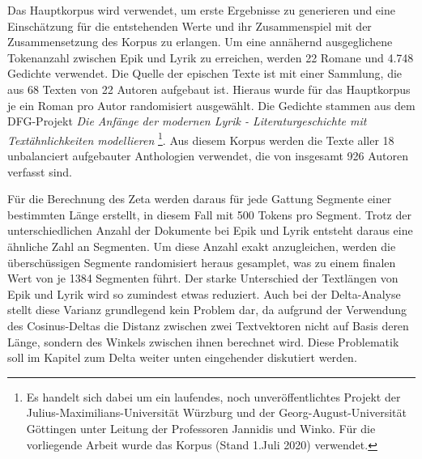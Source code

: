 \documentclass[a4paper,10p]{article}
\begin{document}
Das Hauptkorpus wird verwendet, um erste Ergebnisse zu generieren und eine Einschätz\-ung für die entstehenden Werte und ihr Zusammenspiel mit der Zusammensetzung des Korpus zu erlangen. Um eine annähernd ausgeglichene Tokenanzahl zwischen Epik und Lyrik zu erreichen, werden 22 Romane und 4.748 Gedichte verwendet. Die Quelle der epischen Texte ist \citep{ComputationalStylisticsGroup} mit einer Sammlung, die aus 68 Texten von 22 Autoren aufgebaut ist. Hieraus wurde für das Hauptkorpus je ein Roman pro Autor randomisiert ausgewählt. Die Gedichte stammen aus dem DFG-Projekt \textit{Die Anfänge der modernen Lyrik - Literaturgeschichte mit Textähnlichkeiten modellieren} \footnote{Es handelt sich dabei um ein laufendes, noch unveröffentlichtes Projekt der Julius-Maximilians-Universität Würzburg und der Georg-August-Universität Göttingen unter Leitung der Professoren Jannidis und Winko. Für die vorliegende Arbeit wurde das Korpus (Stand 1.Juli 2020) verwendet.}. Aus diesem Korpus werden die Texte aller 18 unbalanciert aufgebauter Anthologien verwendet, die von insgesamt 926 Autoren verfasst sind. \par 

Für die Berechnung des Zeta werden daraus für jede Gattung Segmente einer bestimmten Länge erstellt, in diesem Fall mit 500 Tokens pro Segment. Trotz der unterschiedlichen Anzahl der Dokumente bei Epik und Lyrik entsteht daraus eine ähnliche Zahl an Segmenten. Um diese Anzahl exakt anzugleichen, werden die überschüssigen Segmente randomisiert heraus gesamplet, was zu einem finalen Wert von je 1384 Segmenten führt. Der starke Unterschied der Textlängen von Epik und Lyrik wird so zumindest etwas reduziert. Auch bei der Delta-Analyse stellt diese Varianz  grundlegend kein Problem dar, da aufgrund der Verwendung des Cosinus-Deltas die Distanz zwischen zwei Textvektoren nicht auf Basis deren Länge, sondern des Winkels zwischen ihnen berechnet wird. Diese Problematik soll im Kapitel zum Delta weiter unten eingehender diskutiert werden. \par 
\end{document}
